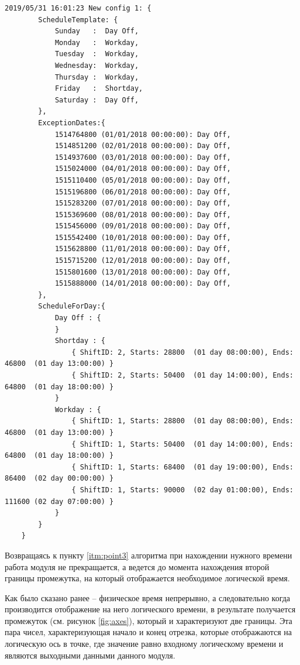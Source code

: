 \begin{lstlisting}[caption={Пример прямого расчета модулем},label={lst:config}]
	2019/05/31 16:01:23 New config 1: {
		ScheduleTemplate: {
			Sunday   :	Day Off,
			Monday   :	Workday,
			Tuesday  :	Workday,
			Wednesday:	Workday,
			Thursday :	Workday,
			Friday   :	Shortday,
			Saturday :	Day Off,
		},
		ExceptionDates:{
			1514764800 (01/01/2018 00:00:00): Day Off,
			1514851200 (02/01/2018 00:00:00): Day Off,
			1514937600 (03/01/2018 00:00:00): Day Off,
			1515024000 (04/01/2018 00:00:00): Day Off,
			1515110400 (05/01/2018 00:00:00): Day Off,
			1515196800 (06/01/2018 00:00:00): Day Off,
			1515283200 (07/01/2018 00:00:00): Day Off,
			1515369600 (08/01/2018 00:00:00): Day Off,
			1515456000 (09/01/2018 00:00:00): Day Off,
			1515542400 (10/01/2018 00:00:00): Day Off,
			1515628800 (11/01/2018 00:00:00): Day Off,
			1515715200 (12/01/2018 00:00:00): Day Off,
			1515801600 (13/01/2018 00:00:00): Day Off,
			1515888000 (14/01/2018 00:00:00): Day Off,
		},
		ScheduleForDay:{
			Day Off : {
			}
			Shortday : {
				{ ShiftID: 2, Starts: 28800  (01 day 08:00:00), Ends: 46800  (01 day 13:00:00) }
				{ ShiftID: 2, Starts: 50400  (01 day 14:00:00), Ends: 64800  (01 day 18:00:00) }
			}
			Workday : {
				{ ShiftID: 1, Starts: 28800  (01 day 08:00:00), Ends: 46800  (01 day 13:00:00) }
				{ ShiftID: 1, Starts: 50400  (01 day 14:00:00), Ends: 64800  (01 day 18:00:00) }
				{ ShiftID: 1, Starts: 68400  (01 day 19:00:00), Ends: 86400  (02 day 00:00:00) }
				{ ShiftID: 1, Starts: 90000  (02 day 01:00:00), Ends: 111600 (02 day 07:00:00) }
			}
		}
	}
\end{lstlisting}

\indent Возвращаясь к пункту \ref{itm:point3} алгоритма при нахождении нужного времени работа модуля не прекращается, а ведется до момента нахождения второй границы промежутка, на который отображается необходимое логической время.

\indent Как было сказано ранее -- физическое время непрерывно, а следовательно когда производится отображение на него логического времени, в результате получается промежуток (см. рисунок \ref{fig:axes}), который и характеризуют две границы.
Эта пара чисел, характеризующая начало и конец отрезка, которые отображаются на логическую ось в точке, где значение равно входному логическому времени и являются выходными данными данного модуля.

